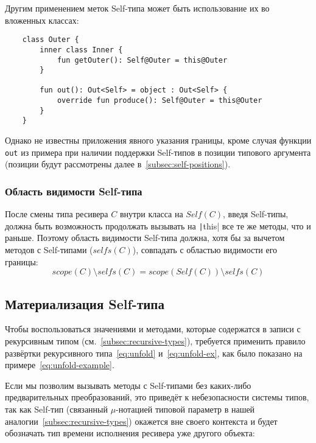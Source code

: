 Другим применением меток Self-типа может быть использование их во вложенных классах:

\begin{verbatim}
    class Outer {
        inner class Inner {
            fun getOuter(): Self@Outer = this@Outer
        }

        fun out(): Out<Self> = object : Out<Self> {
            override fun produce(): Self@Outer = this@Outer
        }
    }
\end{verbatim}

Однако не известны приложения явного указания границы, кроме случая функции \texttt{out} из примера при наличии поддержки Self-типов в позиции типового аргумента (позиции будут рассмотрены далее в~\ref{subsec:self-positions}).

\subsubsection{Область видимости Self-типа} \label{subsubsec:self-type-scope}

После смены типа ресивера $C$ внутри класса на $Self(C)$, введя Self-типы, должна быть возможность продолжать вызывать на \texttt|this| все те же методы, что и раньше.
Поэтому область видимости Self-типа должна, хотя бы за вычетом методов с Self-типами ($selfs(C)$), совпадать с областью видимости его границы:
\begin{equation*}
    scope(C) \setminus selfs(C) = scope(Self(C)) \setminus selfs(C)
\end{equation*}


\subsection{Материализация Self-типа} \label{subsec:materialization}

Чтобы воспользоваться значениями и методами, которые содержатся в записи с рекурсивным типом (см.~\ref{subsec:recursive-types}), требуется применить правило развёртки рекурсивного типа~\eqref{eq:unfold} и~\eqref{eq:unfold-ex}, как было показано на примере~\eqref{eq:unfold-example}.

Если мы позволим вызывать методы с Self-типами без каких-либо предварительных преобразований, это приведёт к небезопасности системы типов, так как Self-тип (связанный $\mu$-нотацией типовой параметр в нашей аналогии~\ref{subsec:recursive-types}) окажется вне своего контекста и будет обозначать тип времени исполнения ресивера уже другого объекта:

